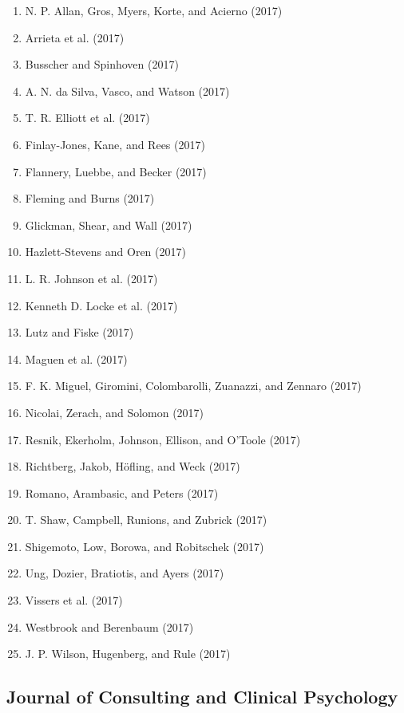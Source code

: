 \documentclass[english,man]{apa6}
\providecommand{\tightlist}{%
  \setlength{\itemsep}{0pt}\setlength{\parskip}{0pt}}
\theoremstyle{definition}
\theoremstyle{definition}
\theoremstyle{definition}
\theoremstyle{remark}
\begin{document}
\begin{enumerate}
\def\labelenumi{\arabic{enumi})}
\tightlist
\item
  N. P. Allan, Gros, Myers, Korte, and Acierno (2017)
\item
  Arrieta et al. (2017)
\item
  Busscher and Spinhoven (2017)
\item
  A. N. da Silva, Vasco, and Watson (2017)
\item
  T. R. Elliott et al. (2017)
\item
  Finlay-Jones, Kane, and Rees (2017)
\item
  Flannery, Luebbe, and Becker (2017)
\item
  Fleming and Burns (2017)
\item
  Glickman, Shear, and Wall (2017)
\item
  Hazlett-Stevens and Oren (2017)
\item
  L. R. Johnson et al. (2017)
\item
  Kenneth D. Locke et al. (2017)
\item
  Lutz and Fiske (2017)
\item
  Maguen et al. (2017)
\item
  F. K. Miguel, Giromini, Colombarolli, Zuanazzi, and Zennaro (2017)
\item
  Nicolai, Zerach, and Solomon (2017)
\item
  Resnik, Ekerholm, Johnson, Ellison, and O'Toole (2017)
\item
  Richtberg, Jakob, Höfling, and Weck (2017)
\item
  Romano, Arambasic, and Peters (2017)
\item
  T. Shaw, Campbell, Runions, and Zubrick (2017)
\item
  Shigemoto, Low, Borowa, and Robitschek (2017)
\item
  Ung, Dozier, Bratiotis, and Ayers (2017)
\item
  Vissers et al. (2017)
\item
  Westbrook and Berenbaum (2017)
\item
  J. P. Wilson, Hugenberg, and Rule (2017)
\end{enumerate}

\subsection{Journal of Consulting and Clinical
Psychology}\label{journal-of-consulting-and-clinical-psychology}
\end{document}

